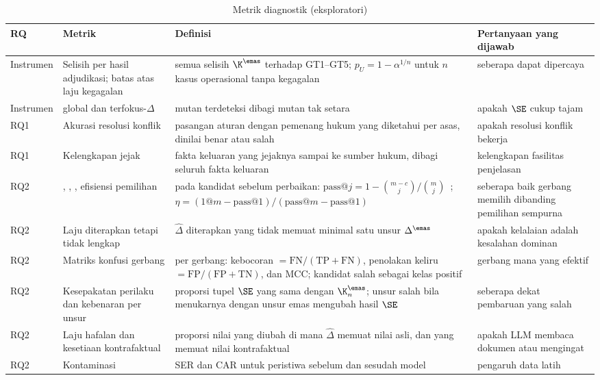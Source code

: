 \begin{table}[t]
\centering
\caption{Metrik diagnostik (eksploratori)}
\label{tab:diagnostik}
\scriptsize
\begin{tabularx}{\textwidth}{@{}P{1.2cm} P{3.3cm} L P{3.6cm}@{}}
\toprule
\textbf{RQ} & \textbf{Metrik} & \textbf{Definisi} & \textbf{Pertanyaan yang dijawab} \\
\midrule
Instrumen & Selisih per hasil adjudikasi; batas atas laju kegagalan & semua selisih $\K^{\emas}$ terhadap GT1--GT5; $p_U = 1-\alpha^{1/n}$ untuk $n$ kasus operasional tanpa kegagalan & seberapa dapat dipercaya  \\
Instrumen &  global dan terfokus-$\Delta$ & mutan terdeteksi dibagi mutan tak setara & apakah $\SE$ cukup tajam \\
RQ1 & Akurasi resolusi konflik & pasangan aturan dengan pemenang hukum yang diketahui per asas, dinilai benar atau salah & apakah resolusi konflik bekerja \\
RQ1 & Kelengkapan jejak & fakta keluaran yang jejaknya sampai ke sumber hukum, dibagi seluruh fakta keluaran & kelengkapan fasilitas penjelasan \\
\midrule
RQ2 & , , , efisiensi pemilihan & pada kandidat sebelum perbaikan: $\text{pass@}j = 1-\binom{m-c}{j}/\binom{m}{j}$~\cite{chen2021evaluating}; $\eta = (\text{1@}m - \text{pass@}1)/(\text{pass@}m - \text{pass@}1)$ & seberapa baik gerbang memilih dibanding pemilihan sempurna \\
RQ2 & Laju diterapkan tetapi tidak lengkap & $\hat{\Delta}$ diterapkan yang tidak memuat minimal satu unsur $\Delta^{\emas}$ & apakah kelalaian adalah kesalahan dominan \\
RQ2 & Matriks konfusi gerbang & per gerbang: kebocoran $=\mathrm{FN}/(\mathrm{TP}+\mathrm{FN})$, penolakan keliru $=\mathrm{FP}/(\mathrm{FP}+\mathrm{TN})$, dan MCC; kandidat salah sebagai kelas positif & gerbang mana yang efektif \\
RQ2 & Kesepakatan perilaku dan kebenaran per unsur & proporsi tupel $\SE$ yang sama dengan $\K^{\emas}_n$; unsur salah bila menukarnya dengan unsur emas mengubah hasil $\SE$ & seberapa dekat pembaruan yang salah \\
RQ2 & Laju hafalan dan kesetiaan kontrafaktual & proporsi nilai yang diubah di mana $\hat{\Delta}$ memuat nilai asli, dan yang memuat nilai kontrafaktual & apakah LLM membaca dokumen atau mengingat \\
RQ2 & Kontaminasi & SER dan CAR untuk peristiwa sebelum dan sesudah  model & pengaruh data latih \\

\end{tabularx}
\end{table}
